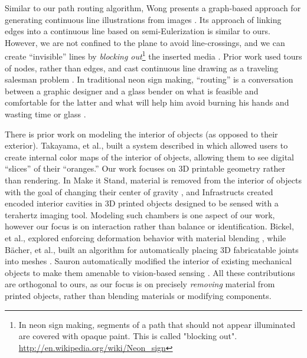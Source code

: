 Similar to our path routing algorithm, Wong presents a graph-based approach for generating continuous line illustrations from images \cite{Wong-continuousline}. Its approach of linking edges into a continuous line based on semi-Eulerization is similar to ours.  However, we are not confined to the plane to avoid line-crossings, and we can create ``invisible'' lines by \emph{blocking out}\footnote{In neon sign making, segments of a path that should not appear illuminated are covered with opaque paint. This is called "blocking out". \url{http://en.wikipedia.org/wiki/Neon_sign}} the inserted media . Prior work used tours of nodes, rather than edges, and cast continuous line drawing as a traveling salesman problem \cite{Bosch-tsp}. In traditional neon sign making, ``routing'' is a conversation between a graphic designer and a glass bender on what is feasible and comfortable for the latter and what will help him avoid burning his hands and wasting time or glass \cite{strattman1997neon}.

There is prior work on modeling the interior of objects (as opposed to their exterior).  Takayama, et al., built a system described in \cite{Takayama-fruit} which allowed users to create internal color maps of the interior of objects, allowing them to see digital ``slices'' of their ``oranges.''  Our work focuses on 3D printable geometry rather than rendering.  In Make it Stand, material is removed from the interior of objects with the goal of changing their center of gravity \cite{Prevost-makeitstand}, and Infrastructs created encoded interior cavities in 3D printed objects designed to be sensed with a terahertz imaging tool.  Modeling such chambers is one aspect of our work, however our focus is on interaction rather than balance or identification.  Bickel, et al., explored enforcing deformation behavior with material blending \cite{Bickel-deformation}, while B\"{a}cher, et al., built an algorithm for automatically placing 3D fabricatable joints into meshes \cite{Bacher-articulated}.  Sauron automatically modified the interior of existing mechanical objects to make them amenable to vision-based sensing \cite{Savage-sauron}.  All these contributions are orthogonal to ours, as our focus is on precisely \emph{removing} material from printed objects, rather than blending materials or modifying components.